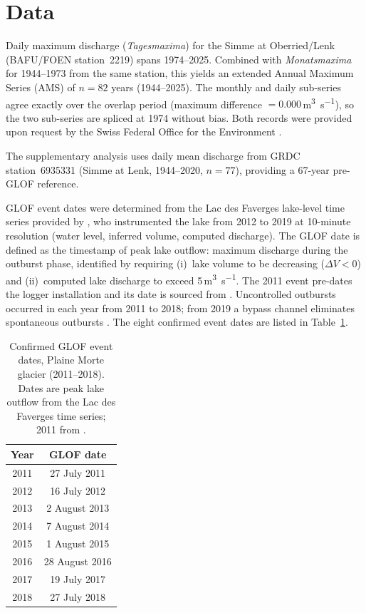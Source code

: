 \section{Data}
\label{sec:data}

Daily maximum discharge (\textit{Tagesmaxima}) for the Simme at Oberried/Lenk
(BAFU/FOEN station~2219) spans 1974--2025. Combined with \textit{Monatsmaxima} for
1944--1973 from the same station, this yields an extended Annual Maximum Series (AMS)
of $n = 82$ years (1944--2025). The monthly and daily sub-series agree exactly over the
overlap period (maximum difference $= 0.000$\,\si{m^3\per s}), so the two sub-series
are spliced at 1974 without bias. Both records were provided upon request by the Swiss Federal
Office for the Environment \citep{BAFU2026}.

The supplementary analysis uses daily mean discharge from GRDC station~6935331
\citep{GRDC2026} (Simme at Lenk, 1944--2020, $n = 77$), providing a 67-year pre-GLOF
reference.

GLOF event dates were determined from the Lac des Faverges lake-level time series
provided by \citet{Ogier2021}, who instrumented the lake from 2012 to 2019 at
10-minute resolution (water level, inferred volume, computed discharge). The GLOF date
is defined as the timestamp of peak lake outflow: maximum discharge during the outburst
phase, identified by requiring (i)~lake volume to be decreasing ($\Delta V < 0$) and
(ii)~computed lake discharge to exceed 5\,\si{m^3\per s}. The 2011 event pre-dates the logger installation and its date is sourced from
\citet{GletsscherseeL2026}. Uncontrolled outbursts occurred in each year from 2011 to
2018; from 2019 a bypass channel eliminates spontaneous outbursts \citep{GeoTest2019}. The eight confirmed event dates are listed in
Table~\ref{tab:glof_dates}.

\begin{table}[H]
  \centering
  \caption{Confirmed GLOF event dates, Plaine Morte glacier (2011--2018). Dates are
           peak lake outflow from the Lac des Faverges time series; 2011 from
           \citet{GletsscherseeL2026}.}
  \label{tab:glof_dates}
  \begin{tabular}{cc}
    \toprule
    Year & GLOF date \\
    \midrule
    2011 & 27 July 2011 \\
    2012 & 16 July 2012 \\
    2013 &  2 August 2013 \\
    2014 &  7 August 2014 \\
    2015 &  1 August 2015 \\
    2016 & 28 August 2016 \\
    2017 & 19 July 2017 \\
    2018 & 27 July 2018 \\
    \bottomrule
  \end{tabular}
\end{table}
